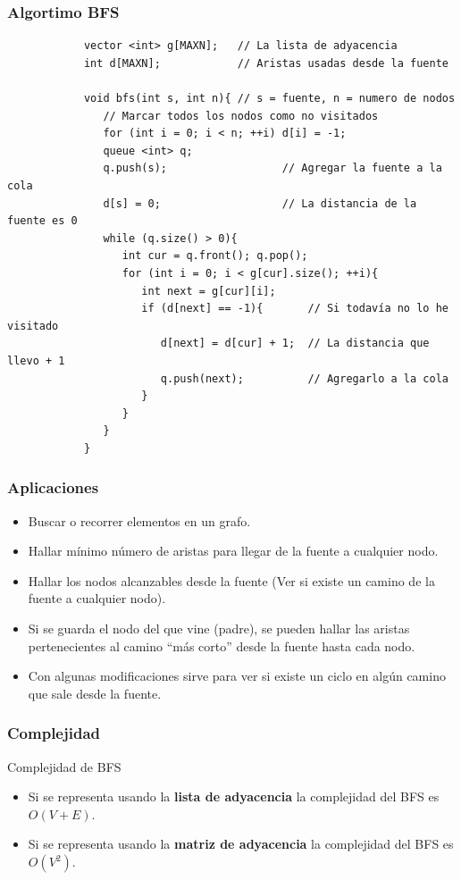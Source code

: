 \documentclass{beamer}
\begin{document}
	\begin{frame}[fragile]
		\frametitle{Algortimo BFS}
		\begin{lstlisting}
			vector <int> g[MAXN];   // La lista de adyacencia
			int d[MAXN];            // Aristas usadas desde la fuente

			void bfs(int s, int n){ // s = fuente, n = numero de nodos
			   // Marcar todos los nodos como no visitados
			   for (int i = 0; i < n; ++i) d[i] = -1;
			   queue <int> q;                
			   q.push(s);                  // Agregar la fuente a la cola
			   d[s] = 0;                   // La distancia de la fuente es 0
			   while (q.size() > 0){
			      int cur = q.front(); q.pop();
			      for (int i = 0; i < g[cur].size(); ++i){
			         int next = g[cur][i];
			         if (d[next] == -1){       // Si todavía no lo he visitado
			            d[next] = d[cur] + 1;  // La distancia que llevo + 1
			            q.push(next);          // Agregarlo a la cola
			         }
			      }
			   }
			}
		\end{lstlisting}
	\end{frame}
	
	\begin{frame}
		\frametitle{Aplicaciones}
		\begin{itemize}
			\item Buscar o recorrer elementos en un grafo.
			\item Hallar mínimo número de aristas para llegar de la fuente a cualquier nodo.
			\item Hallar los nodos alcanzables desde la fuente (Ver si existe un camino de la fuente a cualquier nodo).
			\item Si se guarda el nodo del que vine (padre), se pueden hallar las aristas pertenecientes al camino ``más corto'' desde la fuente hasta cada nodo.
			\item Con algunas modificaciones sirve para ver si existe un ciclo en algún camino que sale desde la fuente.
		\end{itemize}
	\end{frame}
	
	\begin{frame}
		\frametitle{Complejidad}
		\begin{block}{Complejidad de BFS}
			\begin{itemize}
				\item Si se representa usando la \textbf{lista de adyacencia} la complejidad del BFS es $O(V+E)$.
				\item Si se representa usando la \textbf{matriz de adyacencia} la complejidad del BFS es $O(V^2)$.
			\end{itemize}
		\end{block}
	\end{frame}
	
\end{document}
